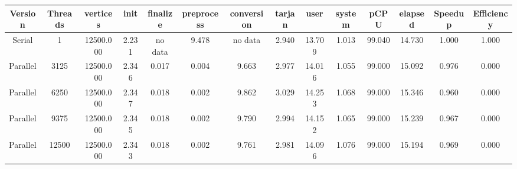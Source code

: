 \begin{tabular}{|c|c|c|c|c|c|c|c|c|c|c|c|c|c|}
\toprule
 Version &  Threads &  vertices &  init & finalize &  preprocess & conversion &  tarjan &   user &  system &   pCPU &  elapsed &  Speedup &  Efficiency \\
\midrule
  Serial &        1 & 12500.000 & 2.231 &  no data &       9.478 &    no data &   2.940 & 13.709 &   1.013 & 99.040 &   14.730 &    1.000 &       1.000 \\
Parallel &     3125 & 12500.000 & 2.346 &    0.017 &       0.004 &      9.663 &   2.977 & 14.016 &   1.055 & 99.000 &   15.092 &    0.976 &       0.000 \\
Parallel &     6250 & 12500.000 & 2.347 &    0.018 &       0.002 &      9.862 &   3.029 & 14.253 &   1.068 & 99.000 &   15.346 &    0.960 &       0.000 \\
Parallel &     9375 & 12500.000 & 2.345 &    0.018 &       0.002 &      9.790 &   2.994 & 14.152 &   1.065 & 99.000 &   15.239 &    0.967 &       0.000 \\
Parallel &    12500 & 12500.000 & 2.343 &    0.018 &       0.002 &      9.761 &   2.981 & 14.096 &   1.076 & 99.000 &   15.194 &    0.969 &       0.000 \\
\bottomrule
\end{tabular}
